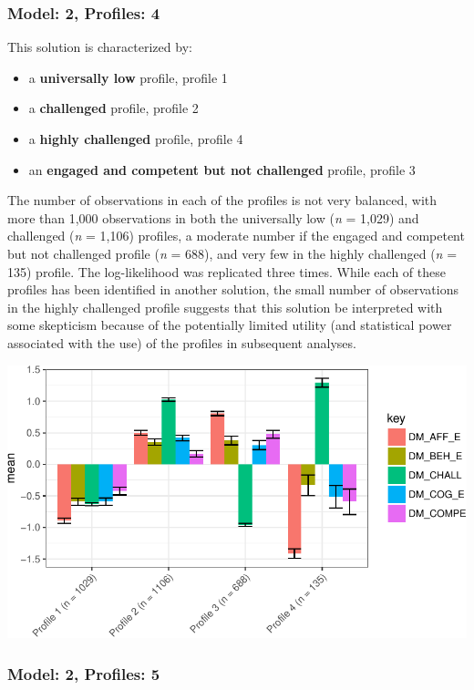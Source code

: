 \documentclass[]{msu-thesis}
\providecommand{\tightlist}{%
  \setlength{\itemsep}{0pt}\setlength{\parskip}{0pt}}
\theoremstyle{definition}
\theoremstyle{definition}
\theoremstyle{definition}
\theoremstyle{remark}
\begin{document}
\subsubsection{Model: 2, Profiles: 4}\label{model-2-profiles-4}

This solution is characterized by:

\begin{itemize}
\tightlist
\item
  a \textbf{universally low} profile, profile 1
\item
  a \textbf{challenged} profile, profile 2
\item
  a \textbf{highly challenged} profile, profile 4
\item
  an \textbf{engaged and competent but not challenged} profile, profile
  3
\end{itemize}

The number of observations in each of the profiles is not very balanced,
with more than 1,000 observations in both the universally low (\emph{n}
= 1,029) and challenged (\emph{n} = 1,106) profiles, a moderate number
if the engaged and competent but not challenged profile (\emph{n} =
688), and very few in the highly challenged (\emph{n} = 135) profile.
The log-likelihood was replicated three times. While each of these
profiles has been identified in another solution, the small number of
observations in the highly challenged profile suggests that this
solution be interpreted with some skepticism because of the potentially
limited utility (and statistical power associated with the use) of the
profiles in subsequent analyses.

\begin{center}\includegraphics[width=0.8\linewidth]{rosenberg-dissertation_files/figure-latex/m2_4p-1} \end{center}

\subsubsection{Model: 2, Profiles: 5}\label{model-2-profiles-5}
\end{document}
